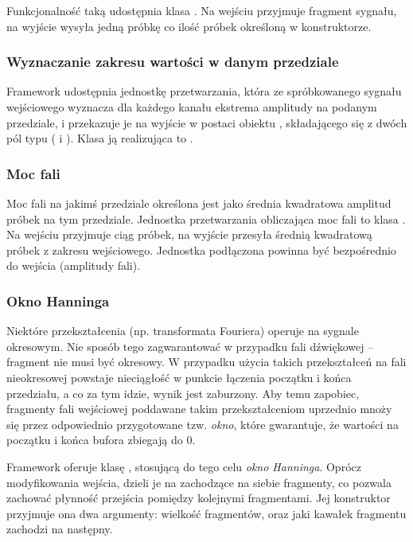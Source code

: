 Funkcjonalność taką udostępnia klasa . Na wejściu przyjmuje fragment sygnału, na
wyjście wysyła jedną próbkę co ilość próbek określoną w konstruktorze.

\subsubsection{Wyznaczanie zakresu wartości w danym przedziale}

Framework udostępnia jednostkę przetwarzania, która ze spróbkowanego sygnału wejściowego wyznacza
dla każdego kanału ekstrema amplitudy na podanym przedziale, i przekazuje je na wyjście w postaci
obiektu , składającego się z dwóch pól typu  ( i ).
Klasa ją realizująca to .

\subsubsection{Moc fali}

Moc fali na jakimś przedziale określona jest jako średnia kwadratowa amplitud próbek na tym
przedziale. Jednostka przetwarzania obliczająca moc fali to klasa . Na wejściu przyjmuje
ciąg próbek, na wyjście przesyła średnią kwadratową próbek z zakresu wejściowego.  Jednostka
podłączona powinna być bezpośrednio do wejścia (amplitudy fali).

\subsubsection{Okno Hanninga}

Niektóre przekształcenia (np. transformata Fouriera) operuje na sygnale okresowym. Nie sposób tego
zagwarantować w przypadku fali dźwiękowej -- fragment nie musi być okresowy. W przypadku użycia
takich przekształceń na fali nieokresowej powstaje nieciągłość w punkcie łączenia początku i końca
przedziału, a co za tym idzie, wynik jest zaburzony. Aby temu zapobiec, fragmenty fali wejściowej
poddawane takim przekształceniom uprzednio mnoży się przez odpowiednio przygotowane tzw.
\emph{okno}, które gwarantuje, że wartości na początku i końca bufora zbiegają do 0.

Framework oferuje klasę , stosującą do tego celu \emph{okno Hanninga}.
Oprócz modyfikowania wejścia, dzieli je na zachodzące na siebie fragmenty, co pozwala zachować
płynność przejścia pomiędzy kolejnymi fragmentami. Jej konstruktor przyjmuje ona dwa argumenty:
wielkość fragmentów, oraz jaki kawałek fragmentu zachodzi na następny.

